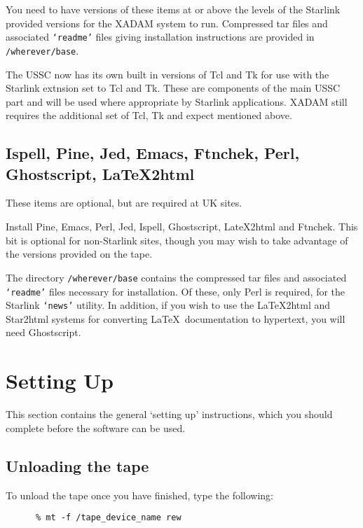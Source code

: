 You need to have versions of these items at or above the levels of the
Starlink provided versions for the XADAM system to run.  Compressed tar
files and associated {\tt `readme'} files giving installation instructions
are provided in {\tt /wherever/base}.

The USSC now has its own built in versions of Tcl and Tk for use with
the Starlink extnsion set to Tcl and Tk.  These are components of the
main USSC part and will be used where appropriate by Starlink
applications.  XADAM still requires the additional set of Tcl, Tk and
expect mentioned above.

\subsection{Ispell, Pine, Jed, Emacs, Ftnchek, Perl, Ghostscript, LaTeX2html}
\label{s:ibase:rest}

These items are optional, but are required at UK sites.

Install Pine, Emacs, Perl, Jed, Ispell, Ghostscript, LateX2html and
Ftnchek. This bit is optional for non-Starlink sites, though you may
wish to take advantage of the versions provided on the tape.

The directory {\tt /wherever/base} contains the compressed tar files and
associated {\tt `readme'} files necessary for installation.  Of these,
only Perl is required, for the Starlink {\tt `news'} utility.  In
addition, if you wish to use the LaTeX2html and Star2html systems for
converting \LaTeX\ documentation to hypertext, you will need
Ghostscript.

\section{Setting Up}
\label{s:setup}

This section contains the general `setting up' instructions, which you
should complete before the software can be used.

\subsection{Unloading the tape}
\label{s:setup:unload}

To unload the tape once you have finished, type the following:

\begin{verbatim}
      % mt -f /tape_device_name rew
\end{verbatim}


